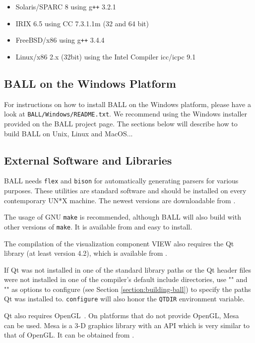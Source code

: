 \begin{itemize}
  \item Solaris/SPARC 8 using g{\tt ++} 3.2.1
  \item IRIX 6.5 using CC 7.3.1.1m (32 and 64 bit)
  \item FreeBSD/x86 using g{\tt ++} 3.4.4
  \item Linux/x86 2.x (32bit) using the Intel \CPP Compiler icc/icpc 9.1
\end{itemize}


\subsection{BALL on the Windows Platform}

For instructions on how to install BALL on the Windows platform, please
have a look at {\tt BALL/Windows/README.txt}. We recommend using the 
Windows installer provided on the BALL project page. The sections below will 
describe how to build BALL on Unix, Linux and MacOS...

\subsection{External Software and Libraries}

BALL needs {\tt flex} and {\tt bison} for automatically generating parsers
for various purposes. These utilities are standard software and should be
installed on every contemporary UN*X machine. The newest versions are
downloadable from .

The usage of GNU {\tt make} is recommended, although BALL will also build with
other versions of {\tt make}. It is available from 
and easy to install.

The compilation of the visualization component VIEW also requires the Qt 
library (at least version 4.2), which is available from
.

If Qt was not installed in one of the standard library paths or the
Qt header files were not installed in one of the compiler's default
include directories, use \mbox{""} and
\mbox{""} as options to configure (see
Section \ref{section:building-ball}) to specify the paths Qt was installed
to. {\tt configure} will also honor the {\tt QTDIR} environment variable.

Qt also requires OpenGL~\cite{OpenGL}. On platforms that do not provide OpenGL,
Mesa~\cite{Mesa} can be used. Mesa is a 3-D graphics library with an API which
is very similar to that of OpenGL. It can be obtained from 
.

